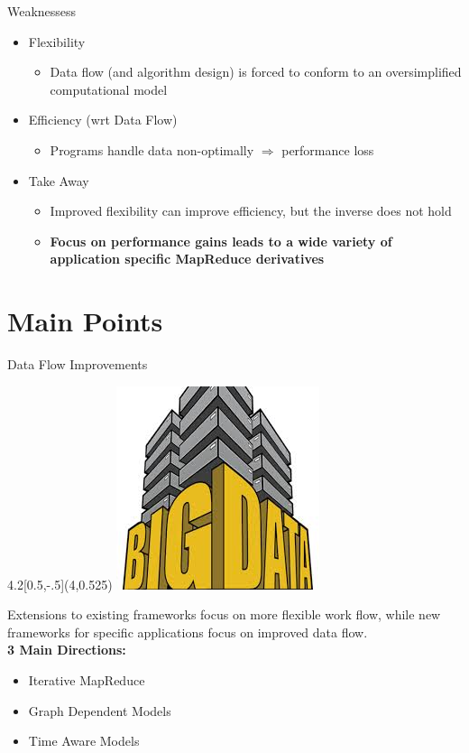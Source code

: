 \documentclass{beamer}
\begin{document}
\begin{frame}{Weaknessess}

\begin{itemize}
\item Flexibility
	\begin{itemize}
	\item Data flow (and algorithm design) is forced to conform to an oversimplified computational model
	\end{itemize}
\item Efficiency (wrt Data Flow)
	\begin{itemize}
	\item Programs handle data non-optimally $\Rightarrow$ performance loss
	\end{itemize}
\item Take Away
	\begin{itemize}
	\item Improved flexibility can improve efficiency, but the inverse does not hold
	\item \textbf{Focus on performance gains leads to a wide variety of application specific MapReduce derivatives}
	\end{itemize}
\end{itemize}

\end{frame}

\section{Main Points}

\begin{frame}{Data Flow Improvements}

\begin{textblock}{4.2}[0.5,-.5](4,0.525)
\includegraphics[scale=.5]{bigdata.jpeg}
\end{textblock}

Extensions to existing frameworks focus on more flexible work flow, while new frameworks for specific applications focus on improved data flow.\\
\vspace{.5cm}
\textbf{3 Main Directions:}
\begin{itemize}
\item Iterative MapReduce
\item Graph Dependent Models
\item Time Aware Models
\end{itemize}

\end{frame}
\end{document}
